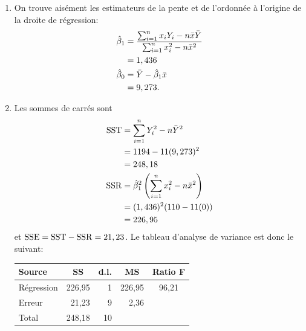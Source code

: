 \begin{solution}{2.13}
    \begin{enumerate}
    \item On trouve aisément les estimateurs de la pente et de
      l'ordonnée à l'origine de la droite de régression:
      \begin{align*}
        \hat{\beta}_1
        &= \frac{\sum_{i=1}^n x_i Y_i - n \bar{x}\bar{Y}}{%
          \sum_{i=1}^n x_i^2 - n \bar{x}^2} \\
        &= 1,436 \\
        \hat{\beta}_0
        &= \bar{Y} - \hat{\beta}_1 \bar{x} \\
        &= 9,273.
      \end{align*}
    \item Les sommes de carrés sont
      \begin{align*}
        \mathrm{SST}
        &= \sum_{i=1}^n Y_i^2 - n \bar{Y}^2 \\
        &= 1194 - 11 (9,273)^2 \\
        &= 248,18 \\
        \mathrm{SSR}
        &= \hat{\beta}_1^2
        \left(
          \sum_{i=1}^n x_i^2 - n \bar{x}^2
        \right) \\
        &= (1,436)^2 (110 - 11 (0)) \\
        &= 226,95
      \end{align*}
      et $\mathrm{SSE} = \mathrm{SST} - \mathrm{SSR} = 21,23$. Le tableau d'analyse de
      variance est donc le suivant:

      \begin{center}
        \begin{tabular}{lrrrc}
          \toprule
          Source
          & \multicolumn{1}{c}{SS}
          & \multicolumn{1}{c}{d.l.}
          & \multicolumn{1}{c}{MS}
          & Ratio F \\
          \midrule
          Régression & 226,95 &   1  & 226,95 & 96,21 \\
          Erreur     &  21,23 &   9  &   2,36 &  \\
          \midrule
          Total      & 248,18 &  10  &        & \\
          \bottomrule
        \end{tabular}
      \end{center}


\end{enumerate}
\end{solution}
